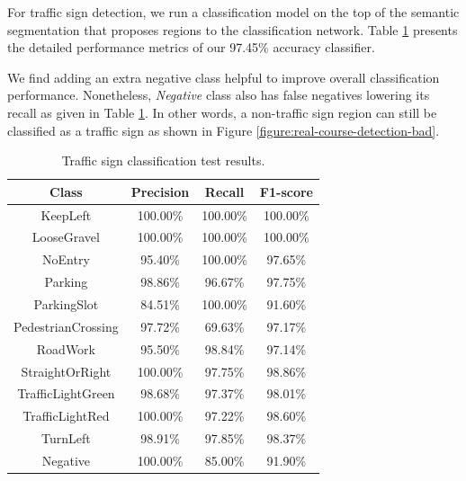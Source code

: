 For traffic sign detection, we run a classification model on the top of the
semantic segmentation that proposes regions to the classification
network. Table \ref{table:classification-test-results} presents the detailed
performance metrics of our 97.45\% accuracy classifier.

We find adding an extra negative class helpful to improve overall
classification performance. Nonetheless, \textit{Negative} class also has false
negatives lowering its recall as given in Table
\ref{table:classification-test-results}. In other words, a non-traffic sign
region can still be classified as a traffic sign as shown in Figure
\ref{figure:real-course-detection-bad}.

\begin{table}[h]
  \begin{center}
    \caption[Traffic sign classification test results]{Traffic sign
      classification test results.}
    \label{table:classification-test-results}
    \begin{tabular}{|c|c|c|c|}
      \hline
      \textbf{Class}     & \textbf{Precision} & \textbf{Recall}  & \textbf{F1-score} \\
      \hline
      KeepLeft           & 100.00\%           & 100.00\%         & 100.00\% \\
      LooseGravel        & 100.00\%           & 100.00\%         & 100.00\% \\
      NoEntry            & 95.40\%            & 100.00\%         &  97.65\% \\
      Parking            & 98.86\%            & 96.67\%          &  97.75\% \\
      ParkingSlot        & 84.51\%            & 100.00\%         &  91.60\% \\
      PedestrianCrossing & 97.72\%            & 69.63\%          &  97.17\% \\
      RoadWork           & 95.50\%            & 98.84\%          &  97.14\% \\
      StraightOrRight    & 100.00\%           & 97.75\%          &  98.86\% \\
      TrafficLightGreen  & 98.68\%            & 97.37\%          &  98.01\% \\
      TrafficLightRed    & 100.00\%           & 97.22\%          &  98.60\% \\
      TurnLeft           & 98.91\%            & 97.85\%          &  98.37\% \\
      Negative           & 100.00\%           & 85.00\%          &  91.90\% \\
      \hline
    \end{tabular}
  \end{center}
\end{table}

